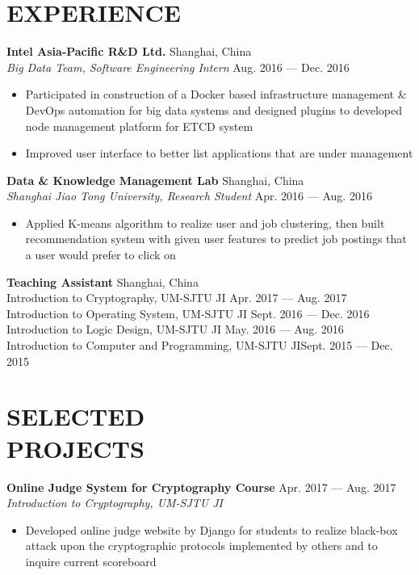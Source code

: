 \documentclass[margin,line,letterpaper]{res}
\begin{document}
\begin{resume}
\section{EXPERIENCE}
{\small
{\bf\normalsize Intel Asia-Pacific R\&D Ltd.} \hfill Shanghai, China \\
{\it Big Data Team, Software Engineering Intern} \hfill Aug. 2016 --- Dec. 2016
}
\begin{itemize}
\setlength{\itemsep}{0pt}
\setlength{\parskip}{0pt}
\setlength{\parsep}{0pt}
\item {\small Participated in construction of a Docker based infrastructure management \& DevOps automation for big data systems and designed plugins to developed node management platform for ETCD system}
\item {\small Improved user interface to better list applications that are under management}
\end{itemize}
\vspace{-.1 in}
{\small
{\bf\normalsize Data \& Knowledge Management Lab}   \hfill Shanghai, China\\
{\it Shanghai Jiao Tong University, Research Student} \hfill Apr. 2016 --- Aug. 2016
}
\begin{itemize}
\setlength{\itemsep}{0pt}
\setlength{\parskip}{0pt}
\setlength{\parsep}{0pt}
\item {\small Applied K-means algorithm to realize user and job clustering, then built recommendation system with given user features to predict job postings that a user would prefer to click on}
\end{itemize}
\vspace{-.1 in}
{
\small
{\bf\normalsize Teaching Assistant} \hfill Shanghai, China\\
{Introduction to Cryptography, UM-SJTU JI} \hfill Apr. 2017 --- Aug. 2017\\
{Introduction to Operating System, UM-SJTU JI} \hfill Sept. 2016 --- Dec. 2016\\
{Introduction to Logic Design, UM-SJTU JI} \hfill May. 2016 --- Aug. 2016 \\
{Introduction to Computer and Programming, UM-SJTU JI}\hfill Sept. 2015 --- Dec. 2015
}
\vspace{-.05 in}

\section{SELECTED\\PROJECTS}
{
\small
{\bf Online Judge System for Cryptography Course} \hfill Apr. 2017 --- Aug. 2017\\
{\it Introduction to Cryptography, UM-SJTU JI}
}
\begin{itemize}
\setlength{\itemsep}{0pt}
\setlength{\parskip}{0pt}
\setlength{\parsep}{0pt}
\item {\small Developed online judge website by Django for students to realize black-box attack upon the cryptographic protocols implemented by others and to inquire current scoreboard}
\end{itemize}
\vspace{-.1 in}


\end{resume}
\end{document}
